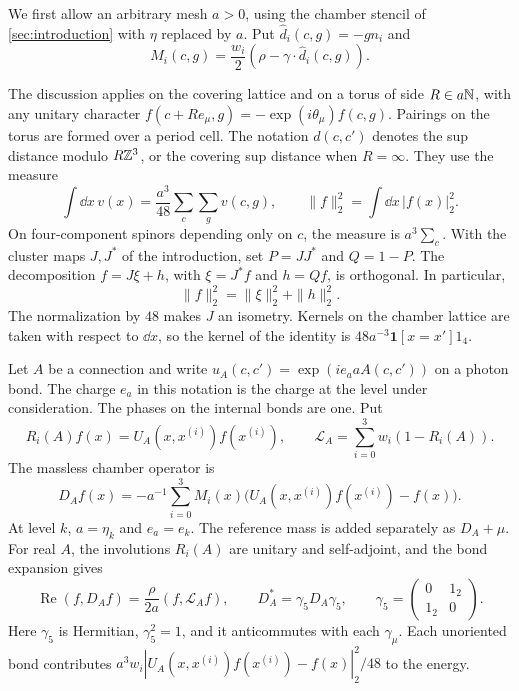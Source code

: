 We first allow an arbitrary mesh $a>0$, using the chamber stencil of
\cref{sec:introduction} with $\eta$ replaced by $a$. Put
$\widehat d_i(c,g)=-gn_i$ and
\[
 M_i(c,g)=\frac{w_i}{2}(\rho-\gamma\cdot\widehat d_i(c,g)).
\]

The discussion applies on the covering lattice and on a torus of side
$R\in a\mathbb N$, with any unitary character
$f(c+Re_\mu,g)=-\exp(i\theta_\mu)f(c,g)$. Pairings on the torus are
formed over a period cell. The notation $d(c,c')$ denotes the sup
distance modulo $R\mathbb Z^3$, or the covering sup distance when $R=\infty$.
They use the measure
\[
 \int\dd x\,v(x)=\frac{a^3}{48}\sum_c\sum_gv(c,g),
 \qquad
 \|f\|_2^2=\int\dd x\,|f(x)|_2^2.
\]
On four-component spinors depending only on $c$, the measure is
$a^3\sum_c$. With the cluster maps $J,J^*$ of the introduction,
set $P=JJ^*$ and $Q=1-P$. The decomposition $f=J\xi+h$, with
$\xi=J^*f$ and $h=Qf$, is orthogonal. In particular,
\begin{equation}\label{eq:cluster-orthogonal}
 \|f\|_2^2=\|\xi\|_2^2+\|h\|_2^2.
\end{equation}
The normalization by $48$ makes $J$ an isometry. Kernels on the chamber
lattice are taken with respect to $\dd x$, so the kernel of the identity
is $48a^{-3}\mathbf1[x=x']1_4$.

Let $A$ be a connection and write
$u_A(c,c')=\exp(ie_a aA(c,c'))$ on a photon bond. The charge $e_a$ in
this notation is the charge at the level under consideration. The
phases on the internal bonds are one. Put
\[
 R_i(A)f(x)=U_A(x,x^{(i)})f(x^{(i)}),\qquad
 \mathcal L_A=\sum_{i=0}^3w_i(1-R_i(A)).
\]
The massless chamber operator is
\begin{equation}\label{eq:propagator-dirac}
 D_Af(x)=-a^{-1}\sum_{i=0}^3M_i(x)
       \big(U_A(x,x^{(i)})f(x^{(i)})-f(x)\big).
\end{equation}
At level $k$, $a=\eta_k$ and $e_a=e_k$. The reference mass is
added separately as $D_A+\mu$.
For real $A$, the involutions $R_i(A)$ are unitary and self-adjoint,
and the bond expansion gives
\begin{equation}\label{eq:dirac-realpart}
 \operatorname{Re}(f,D_Af)=\frac{\rho}{2a}(f,\mathcal L_Af),
 \qquad D_A^*=\gamma_5D_A\gamma_5,
 \qquad \gamma_5=\begin{pmatrix}0&1_2\\1_2&0\end{pmatrix}.
\end{equation}
Here $\gamma_5$ is Hermitian, $\gamma_5^2=1$, and it anticommutes with
each $\gamma_\mu$. Each unoriented bond contributes
$a^3w_i|U_A(x,x^{(i)})f(x^{(i)})-f(x)|_2^2/48$ to the energy.

